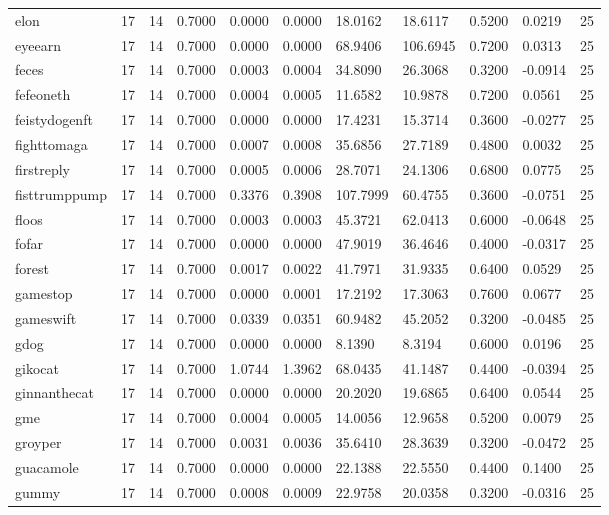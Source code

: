 \begin{table}[htbp]
\begin{tabular}{lllllllllll}
elon & 17 & 14 & 0.7000 & 0.0000 & 0.0000 & 18.0162 & 18.6117 & 0.5200 & 0.0219 & 25 \\
eyeearn & 17 & 14 & 0.7000 & 0.0000 & 0.0000 & 68.9406 & 106.6945 & 0.7200 & 0.0313 & 25 \\
feces & 17 & 14 & 0.7000 & 0.0003 & 0.0004 & 34.8090 & 26.3068 & 0.3200 & -0.0914 & 25 \\
fefeoneth & 17 & 14 & 0.7000 & 0.0004 & 0.0005 & 11.6582 & 10.9878 & 0.7200 & 0.0561 & 25 \\
feistydogenft & 17 & 14 & 0.7000 & 0.0000 & 0.0000 & 17.4231 & 15.3714 & 0.3600 & -0.0277 & 25 \\
fighttomaga & 17 & 14 & 0.7000 & 0.0007 & 0.0008 & 35.6856 & 27.7189 & 0.4800 & 0.0032 & 25 \\
firstreply & 17 & 14 & 0.7000 & 0.0005 & 0.0006 & 28.7071 & 24.1306 & 0.6800 & 0.0775 & 25 \\
fisttrumppump & 17 & 14 & 0.7000 & 0.3376 & 0.3908 & 107.7999 & 60.4755 & 0.3600 & -0.0751 & 25 \\
floos & 17 & 14 & 0.7000 & 0.0003 & 0.0003 & 45.3721 & 62.0413 & 0.6000 & -0.0648 & 25 \\
fofar & 17 & 14 & 0.7000 & 0.0000 & 0.0000 & 47.9019 & 36.4646 & 0.4000 & -0.0317 & 25 \\
forest & 17 & 14 & 0.7000 & 0.0017 & 0.0022 & 41.7971 & 31.9335 & 0.6400 & 0.0529 & 25 \\
gamestop & 17 & 14 & 0.7000 & 0.0000 & 0.0001 & 17.2192 & 17.3063 & 0.7600 & 0.0677 & 25 \\
gameswift & 17 & 14 & 0.7000 & 0.0339 & 0.0351 & 60.9482 & 45.2052 & 0.3200 & -0.0485 & 25 \\
gdog & 17 & 14 & 0.7000 & 0.0000 & 0.0000 & 8.1390 & 8.3194 & 0.6000 & 0.0196 & 25 \\
gikocat & 17 & 14 & 0.7000 & 1.0744 & 1.3962 & 68.0435 & 41.1487 & 0.4400 & -0.0394 & 25 \\
ginnanthecat & 17 & 14 & 0.7000 & 0.0000 & 0.0000 & 20.2020 & 19.6865 & 0.6400 & 0.0544 & 25 \\
gme & 17 & 14 & 0.7000 & 0.0004 & 0.0005 & 14.0056 & 12.9658 & 0.5200 & 0.0079 & 25 \\
groyper & 17 & 14 & 0.7000 & 0.0031 & 0.0036 & 35.6410 & 28.3639 & 0.3200 & -0.0472 & 25 \\
guacamole & 17 & 14 & 0.7000 & 0.0000 & 0.0000 & 22.1388 & 22.5550 & 0.4400 & 0.1400 & 25 \\
gummy & 17 & 14 & 0.7000 & 0.0008 & 0.0009 & 22.9758 & 20.0358 & 0.3200 & -0.0316 & 25 \\

\end{tabular}
\end{table}

